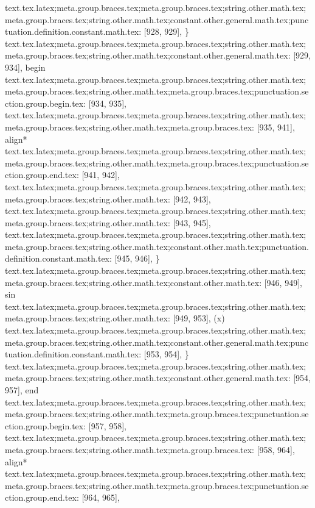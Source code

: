 {{{{{{{{{{{{{{{{{{{{{{{{{{{{{{}
text.tex.latex;meta.group.braces.tex;meta.group.braces.tex;string.other.math.tex;meta.group.braces.tex;string.other.math.tex;constant.other.general.math.tex;punctuation.definition.constant.math.tex: [928, 929], {\}
text.tex.latex;meta.group.braces.tex;meta.group.braces.tex;string.other.math.tex;meta.group.braces.tex;string.other.math.tex;constant.other.general.math.tex: [929, 934], {begin}
text.tex.latex;meta.group.braces.tex;meta.group.braces.tex;string.other.math.tex;meta.group.braces.tex;string.other.math.tex;meta.group.braces.tex;punctuation.section.group.begin.tex: [934, 935], {{}
text.tex.latex;meta.group.braces.tex;meta.group.braces.tex;string.other.math.tex;meta.group.braces.tex;string.other.math.tex;meta.group.braces.tex: [935, 941], {align*}
text.tex.latex;meta.group.braces.tex;meta.group.braces.tex;string.other.math.tex;meta.group.braces.tex;string.other.math.tex;meta.group.braces.tex;punctuation.section.group.end.tex: [941, 942], {}}
text.tex.latex;meta.group.braces.tex;meta.group.braces.tex;string.other.math.tex;meta.group.braces.tex;string.other.math.tex: [942, 943], {
}
text.tex.latex;meta.group.braces.tex;meta.group.braces.tex;string.other.math.tex;meta.group.braces.tex;string.other.math.tex: [943, 945], {  }
text.tex.latex;meta.group.braces.tex;meta.group.braces.tex;string.other.math.tex;meta.group.braces.tex;string.other.math.tex;constant.other.math.tex;punctuation.definition.constant.math.tex: [945, 946], {\}
text.tex.latex;meta.group.braces.tex;meta.group.braces.tex;string.other.math.tex;meta.group.braces.tex;string.other.math.tex;constant.other.math.tex: [946, 949], {sin}
text.tex.latex;meta.group.braces.tex;meta.group.braces.tex;string.other.math.tex;meta.group.braces.tex;string.other.math.tex: [949, 953], {(x)
}
text.tex.latex;meta.group.braces.tex;meta.group.braces.tex;string.other.math.tex;meta.group.braces.tex;string.other.math.tex;constant.other.general.math.tex;punctuation.definition.constant.math.tex: [953, 954], {\}
text.tex.latex;meta.group.braces.tex;meta.group.braces.tex;string.other.math.tex;meta.group.braces.tex;string.other.math.tex;constant.other.general.math.tex: [954, 957], {end}
text.tex.latex;meta.group.braces.tex;meta.group.braces.tex;string.other.math.tex;meta.group.braces.tex;string.other.math.tex;meta.group.braces.tex;punctuation.section.group.begin.tex: [957, 958], {{}
text.tex.latex;meta.group.braces.tex;meta.group.braces.tex;string.other.math.tex;meta.group.braces.tex;string.other.math.tex;meta.group.braces.tex: [958, 964], {align*}
text.tex.latex;meta.group.braces.tex;meta.group.braces.tex;string.other.math.tex;meta.group.braces.tex;string.other.math.tex;meta.group.braces.tex;punctuation.section.group.end.tex: [964, 965], {}}
}}}}}}}}}}}}}}}}}}}}}}}}}}}}}}}}
